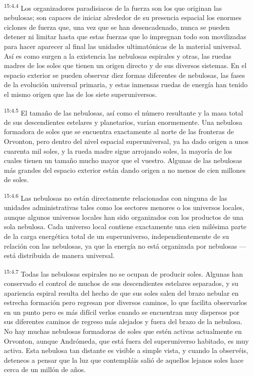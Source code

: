 \par
\textsuperscript{15:4.4} Los organizadores paradisiacos de la fuerza son los que originan las nebulosas; son capaces de iniciar alrededor de su presencia espacial los enormes ciclones de fuerza que, una vez que se han desencadenado, nunca se pueden detener ni limitar hasta que estas fuerzas que lo impregnan todo son movilizadas para hacer aparecer al final las unidades ultimatónicas de la material universal. Así es como surgen a la existencia las nebulosas espirales y otras, las ruedas madres de los soles que tienen un origen directo y de sus diversos sistemas. En el espacio exterior se pueden observar diez formas diferentes de nebulosas, las fases de la evolución universal primaria, y estas inmensas ruedas de energía han tenido el mismo origen que las de los siete superuniversos.

\par
\textsuperscript{15:4.5} El tamaño de las nebulosas, así como el número resultante y la masa total de sus descendientes estelares y planetarios, varían enormemente. Una nebulosa formadora de soles que se encuentra exactamente al norte de las fronteras de Orvonton, pero dentro del nivel espacial superuniversal, ya ha dado origen a unos cuarenta mil soles, y la rueda madre sigue arrojando soles, la mayoría de los cuales tienen un tamaño mucho mayor que el vuestro. Algunas de las nebulosas más grandes del espacio exterior están dando origen a no menos de cien millones de soles.

\par
\textsuperscript{15:4.6} Las nebulosas no están directamente relacionadas con ninguna de las unidades administrativas tales como los sectores menores o los universos locales, aunque algunos universos locales han sido organizados con los productos de una sola nebulosa. Cada universo local contiene exactamente una cien milésima parte de la carga energética total de un superuniverso, independientemente de su relación con las nebulosas, ya que la energía no está organizada por nebulosas ---está distribuida de manera universal.

\par
\textsuperscript{15:4.7} Todas las nebulosas espirales no se ocupan de producir soles. Algunas han conservado el control de muchos de sus descendientes estelares separados, y su apariencia espiral resulta del hecho de que sus soles salen del brazo nebular en estrecha formación pero regresan por diversos caminos, lo que facilita observarlos en un punto pero es más difícil verlos cuando se encuentran muy dispersos por sus diferentes caminos de regreso más alejados y fuera del brazo de la nebulosa. No hay muchas nebulosas formadoras de soles que estén activas actualmente en Orvonton, aunque Andrómeda, que está fuera del superuniverso habitado, es muy activa. Esta nebulosa tan distante es visible a simple vista, y cuando la observéis, deteneos a pensar que la luz que contempláis salió de aquellos lejanos soles hace cerca de un millón de años.

